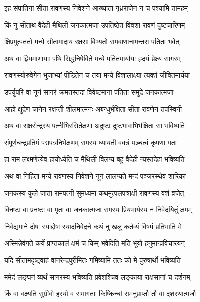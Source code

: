 \twolineshloka
{इह संपातिना सीता रावणस्य निवेशने}
{आख्याता गृध्रराजेन न च पश्यामि तामहम्} %

\twolineshloka
{किं नु सीताथ वैदेही मैथिली जनकात्मजा}
{उपतिष्ठेत विवशा रावणं दुष्टचारिणम्} %

\twolineshloka
{क्षिप्रमुत्पततो मन्ये सीतामादाय रक्षसः}
{बिभ्यतो रामबाणानामन्तरा पतिता भवेत्} %

\twolineshloka
{अथ वा ह्रियमाणायाः पथि सिद्धनिषेविते}
{मन्ये पतितमार्याया हृदयं प्रेक्ष्य सागरम्} %

\twolineshloka
{रावणस्योरुवेगेन भुजाभ्यां पीडितेन च}
{तया मन्ये विशालाक्ष्या त्यक्तं जीवितमार्यया} %

\twolineshloka
{उपर्युपरि वा नूनं सागरं क्रमतस्तदा}
{विवेष्टमाना पतिता समुद्रे जनकात्मजा} %

\twolineshloka
{आहो क्षुद्रेण चानेन रक्षन्ती शीलमात्मनः}
{अबन्धुर्भक्षिता सीता रावणेन तपस्विनी} %

\twolineshloka
{अथ वा राक्षसेन्द्रस्य पत्नीभिरसितेक्षणा}
{अदुष्टा दुष्टभावाभिर्भक्षिता सा भविष्यति} %

\twolineshloka
{संपूर्णचन्द्रप्रतिमं पद्मपत्रनिभेक्षणम्}
{रामस्य ध्यायती वक्त्रं पञ्चत्वं कृपणा गता} %

\twolineshloka
{हा राम लक्ष्मणेत्येव हायोध्येति च मैथिली}
{विलप्य बहु वैदेही न्यस्तदेहा भविष्यति} %

\twolineshloka
{अथ वा निहिता मन्ये रावणस्य निवेशने}
{नूनं लालप्यते मन्दं पञ्जरस्थेव शारिका} %

\twolineshloka
{जनकस्य कुले जाता रामपत्नी सुमध्यमा}
{कथमुत्पलपत्राक्षी रावणस्य वशं व्रजेत्} %

\twolineshloka
{विनष्टा वा प्रनष्टा वा मृता वा जनकात्मजा}
{रामस्य प्रियभार्यस्य न निवेदयितुं क्षमम्} %

\twolineshloka
{निवेद्यमाने दोषः स्याद्दोषः स्यादनिवेदने}
{कथं नु खलु कर्तव्यं विषमं प्रतिभाति मे} %

\twolineshloka
{अस्मिन्नेवंगते कर्ये प्राप्तकालं क्षमं च किम्}
{भवेदिति मतिं भूयो हनुमान्प्रविचारयन्} %

\twolineshloka
{यदि सीतामदृष्ट्वाहं वानरेन्द्रपुरीमितः}
{गमिष्यामि ततः को मे पुरुषार्थो भविष्यति} %

\twolineshloka
{ममेदं लङ्घनं व्यर्थं सागरस्य भविष्यति}
{प्रवेशश्चिव लङ्काया राक्षसानां च दर्शनम्} %

\twolineshloka
{किं वा वक्ष्यति सुग्रीवो हरयो व समागताः}
{किष्किन्धां समनुप्राप्तौ तौ वा दशरथात्मजौ} %

